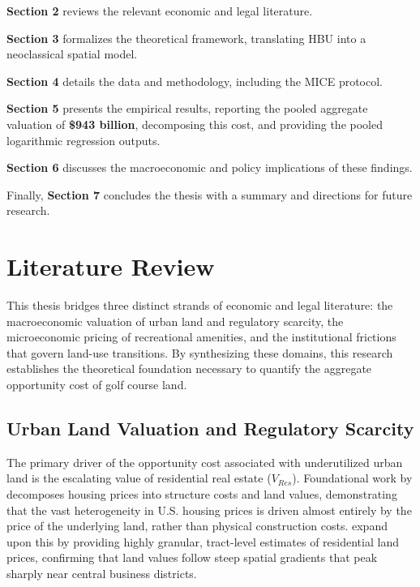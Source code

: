 \documentclass[10pt, letterpaper]{article}
\begin{document}
\textbf{Section 2} reviews the relevant economic and legal literature. 

\textbf{Section 3} formalizes the theoretical framework, translating HBU into a neoclassical spatial model. 

\textbf{Section 4} details the data and methodology, including the MICE protocol. 

\textbf{Section 5} presents the empirical results, reporting the pooled aggregate valuation of \textbf{\$943 billion}, decomposing this cost, and providing the pooled logarithmic regression outputs. 

\textbf{Section 6} discusses the macroeconomic and policy implications of these findings. 

Finally, \textbf{Section 7} concludes the thesis with a summary and directions for future research.

\newpage

\section{Literature Review}
This thesis bridges three distinct strands of economic and legal literature: the macroeconomic valuation of urban land and regulatory scarcity, the microeconomic pricing of recreational amenities, and the institutional frictions that govern land-use transitions. By synthesizing these domains, this research establishes the theoretical foundation necessary to quantify the aggregate opportunity cost of golf course land.

\subsection{Urban Land Valuation and Regulatory Scarcity}
The primary driver of the opportunity cost associated with underutilized urban land is the escalating value of residential real estate ($V_{Res}$). Foundational work by \textcite{Davis2008} decomposes housing prices into structure costs and land values, demonstrating that the vast heterogeneity in U.S. housing prices is driven almost entirely by the price of the underlying land, rather than physical construction costs. \textcite{Davis2021} expand upon this by providing highly granular, tract-level estimates of residential land prices, confirming that land values follow steep spatial gradients that peak sharply near central business districts. 
\end{document}

